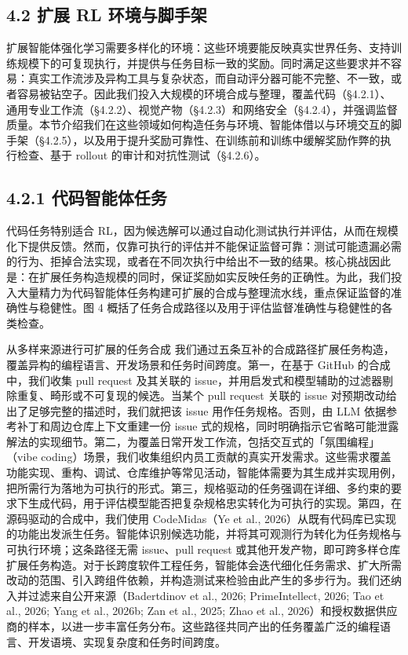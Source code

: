 \subsection{4.2 扩展 RL 环境与脚手架}\label{scaling-rl-environments-and-harnesses}

扩展智能体强化学习需要多样化的环境：这些环境要能反映真实世界任务、支持训练规模下的可复现执行，并提供与任务目标一致的奖励。同时满足这些要求并不容易：真实工作流涉及异构工具与复杂状态，而自动评分器可能不完整、不一致，或者容易被钻空子。因此我们投入大规模的环境合成与整理，覆盖代码（§4.2.1）、通用专业工作流（§4.2.2）、视觉产物（§4.2.3）和网络安全（§4.2.4），并强调监督质量。本节介绍我们在这些领域如何构造任务与环境、智能体借以与环境交互的脚手架（§4.2.5），以及用于提升奖励可靠性、在训练前和训练中缓解奖励作弊的执行检查、基于 rollout 的审计和对抗性测试（§4.2.6）。

\subsection{4.2.1 代码智能体任务}\label{code-agent-tasks}

代码任务特别适合 RL，因为候选解可以通过自动化测试执行并评估，从而在规模化下提供反馈。然而，仅靠可执行的评估并不能保证监督可靠：测试可能遗漏必需的行为、拒掉合法实现，或者在不同次执行中给出不一致的结果。核心挑战因此是：在扩展任务构造规模的同时，保证奖励如实反映任务的正确性。为此，我们投入大量精力为代码智能体任务构建可扩展的合成与整理流水线，重点保证监督的准确性与稳健性。图 4 概括了任务合成路径以及用于评估监督准确性与稳健性的各类检查。

从多样来源进行可扩展的任务合成 我们通过五条互补的合成路径扩展任务构造，覆盖异构的编程语言、开发场景和任务时间跨度。第一，在基于 GitHub 的合成中，我们收集 pull request 及其关联的 issue，并用启发式和模型辅助的过滤器剔除重复、畸形或不可复现的候选。当某个 pull request 关联的 issue 对预期改动给出了足够完整的描述时，我们就把该 issue 用作任务规格。否则，由 LLM 依据参考补丁和周边仓库上下文重建一份 issue 式的规格，同时明确指示它省略可能泄露解法的实现细节。第二，为覆盖日常开发工作流，包括交互式的「氛围编程」（vibe coding）场景，我们收集组织内员工贡献的真实开发需求。这些需求覆盖功能实现、重构、调试、仓库维护等常见活动，智能体需要为其生成并实现用例，把所需行为落地为可执行的形式。第三，规格驱动的任务强调在详细、多约束的要求下生成代码，用于评估模型能否把复杂规格忠实转化为可执行的实现。第四，在源码驱动的合成中，我们使用 CodeMidas（Ye et al., 2026）从既有代码库已实现的功能出发派生任务。智能体识别候选功能，并将其可观测行为转化为任务规格与可执行环境；这条路径无需 issue、pull request 或其他开发产物，即可跨多样仓库扩展任务构造。对于长跨度软件工程任务，智能体会迭代细化任务需求、扩大所需改动的范围、引入跨组件依赖，并构造测试来检验由此产生的多步行为。我们还纳入并过滤来自公开来源（Badertdinov et al., 2026; PrimeIntellect, 2026; Tao et al., 2026; Yang et al., 2026b; Zan et al., 2025; Zhao et al., 2026）和授权数据供应商的样本，以进一步丰富任务分布。这些路径共同产出的任务覆盖广泛的编程语言、开发语境、实现复杂度和任务时间跨度。




